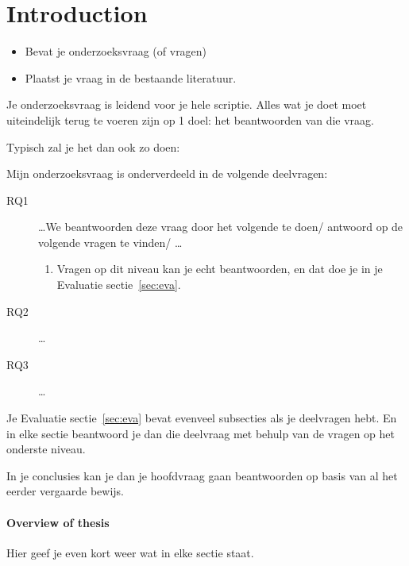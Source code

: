 \section{Introduction}
\label{sec:intro}
\begin{itemize}
\item Bevat je onderzoeksvraag (of vragen)
\item Plaatst je vraag in de bestaande literatuur.
\end{itemize}

Je onderzoeksvraag is leidend voor je hele scriptie. Alles wat je doet moet uiteindelijk terug te voeren zijn op 1 doel: het beantwoorden van die vraag. 

Typisch zal je het dan ook zo doen:

Mijn onderzoeksvraag is onderverdeeld in de volgende deelvragen:

\begin{description}
\item[RQ1] \ldots We   beantwoorden deze vraag  door het volgende te doen/ antwoord op de volgende vragen te vinden/ \ldots
\begin{enumerate}
\item Vragen op dit niveau kan je echt beantwoorden, en dat doe je in je Evaluatie sectie~\ref{sec:eva}.
\end{enumerate}
\item[RQ2] \ldots
\item[RQ3] \ldots
\end{description}
%
Je Evaluatie sectie~\ref{sec:eva} bevat evenveel subsecties als je deelvragen hebt. En in elke sectie beantwoord je dan die deelvraag met behulp van de vragen op het onderste niveau.

In je conclusies kan je dan je hoofdvraag gaan beantwoorden op basis van al het eerder vergaarde bewijs.


\paragraph{Overview of thesis}
Hier geef je even kort weer wat in elke sectie staat.
